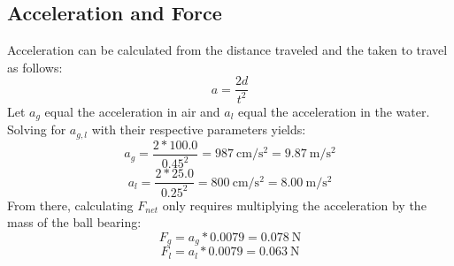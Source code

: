 \documentclass[a4paper]{article}
\begin{document}
        \subsection{Acceleration and Force}
            \begin{center}
                Acceleration can be calculated from the distance traveled and the
                taken to travel as follows:
                \begin{equation}
                    a=\frac{2d}{t^2}
                \end{equation}
                Let $a_g$ equal the acceleration in air and $a_l$ equal the acceleration
                in the water. Solving for $a_{g,l}$ with their respective parameters
                yields:
                \begin{equation}
                    a_g=\frac{2*100.0}{0.45^2}=\SI{987}{\cm\per\s\squared}=\SI{9.87}{\m\per\s\squared}
                \end{equation}
                \begin{equation}
                    a_l=\frac{2*25.0}{0.25^2}=\SI{800}{\cm\per\s\squared}=\SI{8.00}{\m\per\s\squared}
                \end{equation}
                From there, calculating $F_{net}$ only requires multiplying the acceleration
                by the mass of the ball bearing:
                \begin{equation}
                    F_g=a_g*0.0079=\SI{0.078}{\N}
                \end{equation}
                \begin{equation}
                    F_l=a_l*0.0079=\SI{0.063}{\N}
                \end{equation}
            \end{center}
\end{document}
